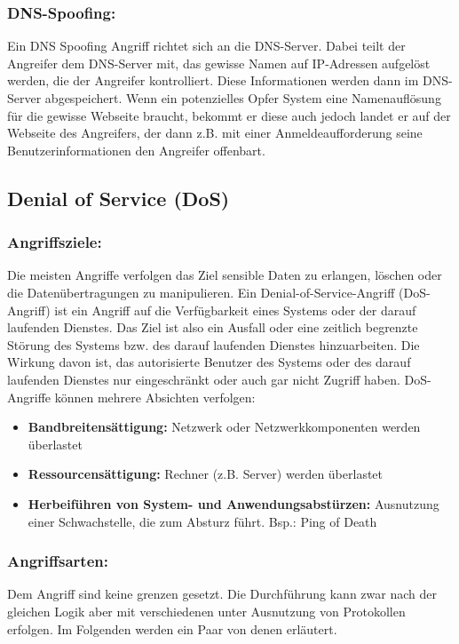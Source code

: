 \subsubsection{DNS-Spoofing:}
Ein DNS Spoofing Angriff richtet sich an die DNS-Server. Dabei teilt der Angreifer dem DNS-Server mit, das gewisse Namen auf IP-Adressen aufgelöst werden, die der Angreifer kontrolliert. Diese Informationen werden dann im DNS-Server abgespeichert. Wenn ein potenzielles Opfer System eine Namenauflösung für die gewisse Webseite braucht, bekommt er diese auch jedoch landet er auf der Webseite des Angreifers, der dann z.B. mit einer Anmeldeaufforderung seine Benutzerinformationen den Angreifer offenbart.\cite{ref_book_attack_6} \par

\subsection{Denial of Service (DoS)}
\subsubsection{Angriffsziele:}
Die meisten Angriffe verfolgen das Ziel sensible Daten zu erlangen, löschen oder die Datenübertragungen zu manipulieren. Ein Denial-of-Service-Angriff (DoS-Angriff) ist ein Angriff auf die Verfügbarkeit eines Systems oder der darauf laufenden Dienstes. Das Ziel ist also ein Ausfall oder eine zeitlich begrenzte Störung des Systems bzw. des darauf laufenden Dienstes hinzuarbeiten. Die Wirkung davon ist, das autorisierte Benutzer des Systems oder des darauf laufenden Dienstes nur eingeschränkt oder auch gar nicht Zugriff haben. DoS-Angriffe können mehrere Absichten verfolgen: 
\begin{itemize}
    \item \textbf{Bandbreitensättigung:} Netzwerk oder Netzwerkkomponenten werden überlastet
    \item \textbf{Ressourcensättigung:} Rechner (z.B. Server) werden überlastet
    \item \textbf{Herbeiführen von System- und Anwendungsabstürzen:} Ausnutzung einer Schwachstelle, die zum Absturz führt. Bsp.: Ping of Death
\end{itemize}\cite{ref_book_attack_2}\par

\subsubsection{Angriffsarten:}
Dem Angriff sind keine grenzen gesetzt. Die Durchführung kann zwar nach der gleichen Logik aber mit verschiedenen unter Ausnutzung von Protokollen erfolgen. Im Folgenden werden ein Paar von denen erläutert.\par


